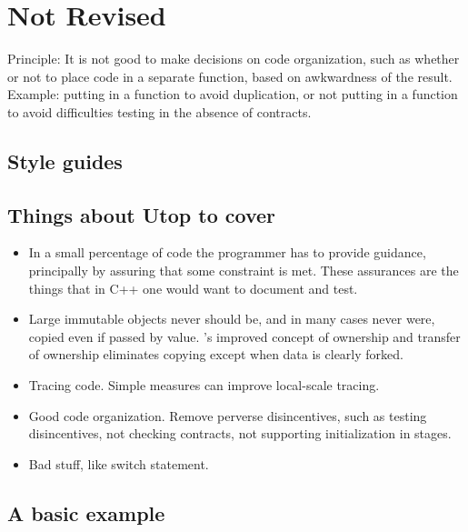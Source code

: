 \documentclass[10pt]{amsart}
\begin{document}
\section{Not Revised}

Principle: It is not good to make decisions on code organization, such
as whether or not to place code in a separate function, based on
awkwardness  of the result.  Example: putting in a function to avoid
duplication, or not putting in a function to avoid difficulties
testing in the absence of contracts.

\subsection{Style guides}


\subsection{Things about Utop to cover}

\begin{itemize}
\item In a small percentage of code the programmer has to provide
  guidance, principally by assuring that some constraint is met.
  These assurances are the things that in C++ one would want to
  document and test.
\item Large immutable objects never should be, and in many cases never
  were, copied even if passed by value.  \Utop's improved concept of
  ownership and transfer of ownership eliminates copying except when
  data is clearly forked.
\item Tracing code.  Simple measures can improve local-scale tracing.
\item Good code organization.  Remove perverse disincentives, such as
  testing disincentives, not checking contracts, not supporting
  initialization in stages.
\item Bad stuff, like switch statement.
\end{itemize}

\subsection{A basic example}
\end{document}
